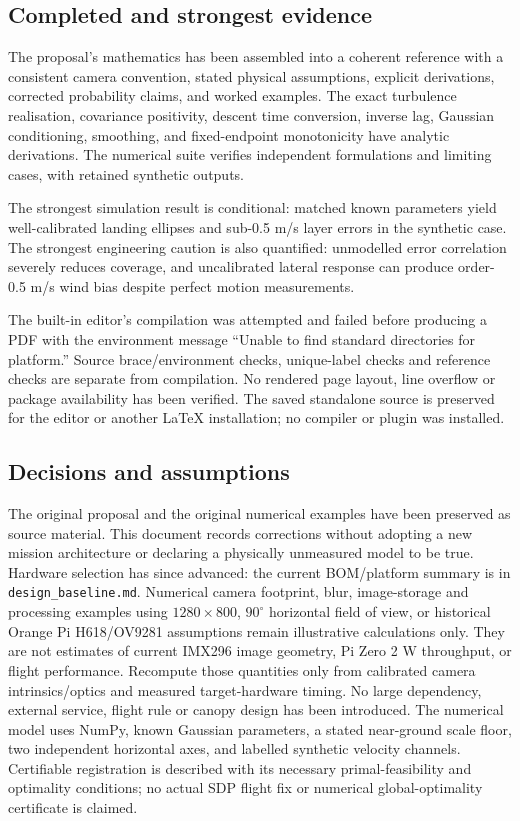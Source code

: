 \documentclass[11pt,a4paper]{article}
\numberwithin{equation}{section}
\begin{document}
\subsection{Completed and strongest evidence}
The proposal's mathematics has been assembled into a coherent reference with a consistent camera convention, stated physical assumptions, explicit derivations, corrected probability claims, and worked examples. The exact turbulence realisation, covariance positivity, descent time conversion, inverse lag, Gaussian conditioning, smoothing, and fixed-endpoint monotonicity have analytic derivations. The numerical suite verifies independent formulations and limiting cases, with retained synthetic outputs.

The strongest simulation result is conditional: matched known parameters yield well-calibrated landing ellipses and sub-0.5 m/s layer errors in the synthetic case. The strongest engineering caution is also quantified: unmodelled error correlation severely reduces coverage, and uncalibrated lateral response can produce order-0.5 m/s wind bias despite perfect motion measurements.

The built-in editor's compilation was attempted and failed before producing a PDF with the environment message ``Unable to find standard directories for platform.'' Source brace/environment checks, unique-label checks and reference checks are separate from compilation. No rendered page layout, line overflow or package availability has been verified. The saved standalone source is preserved for the editor or another LaTeX installation; no compiler or plugin was installed.

\subsection{Decisions and assumptions}
The original proposal and the original numerical examples have been preserved as source material. This document records corrections without adopting a new mission architecture or declaring a physically unmeasured model to be true. Hardware selection has since advanced: the current BOM/platform summary is in \texttt{design\_baseline.md}. Numerical camera footprint, blur, image-storage and processing examples using $1280\times800$, $90^\circ$ horizontal field of view, or historical Orange Pi H618/OV9281 assumptions remain illustrative calculations only. They are not estimates of current IMX296 image geometry, Pi Zero 2 W throughput, or flight performance. Recompute those quantities only from calibrated camera intrinsics/optics and measured target-hardware timing. No large dependency, external service, flight rule or canopy design has been introduced. The numerical model uses NumPy, known Gaussian parameters, a stated near-ground scale floor, two independent horizontal axes, and labelled synthetic velocity channels. Certifiable registration is described with its necessary primal-feasibility and optimality conditions; no actual SDP flight fix or numerical global-optimality certificate is claimed.
\end{document}
